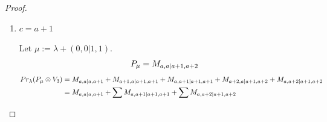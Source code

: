 \begin{proof}
\begin{enumerate}
\begin{enumerate}
      \item $ c = a+1 $\par
        Let $\mu:=\lambda + (0,0|1,1) $.
        \begin{equation}\notag
          \begin{aligned}
            P_\mu = M_{a,a|a+1,a+2}
          \end{aligned}
        \end{equation}
        \begin{equation}\notag
          \begin{aligned}
            Pr_{\lambda}(P_\mu \otimes V_{3}) &=
M_{a,a|a,a+1}
+ M_{a+1,a|a+1,a+1}
+ M_{a,a+1|a+1,a+1}
+ M_{a+2,a|a+1,a+2}
+ M_{a,a+2|a+1,a+2} \\
                                               &=
 M_{a,a|a,a+1}
+ \sum M_{a,a+1|a+1,a+1}
+ \sum M_{a,a+2|a+1,a+2}
          \end{aligned}
        \end{equation}
    \end{enumerate}
\end{enumerate}
\end{proof}

